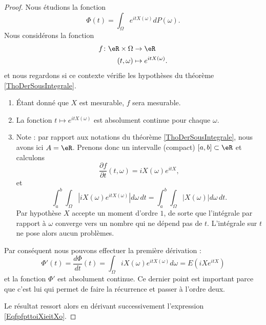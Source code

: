 \begin{proof}
    Nous étudions la fonction
    \begin{equation}
        \Phi(t)=\int_{\Omega} e^{itX(\omega)}dP(\omega).
    \end{equation}
    Nous considérons la fonction
    \begin{equation}
        \begin{aligned}
            f\colon \eR\times\Omega&\to \eR \\
            (t,\omega)&\mapsto  e^{itX(\omega)}. 
        \end{aligned}
    \end{equation}
    et nous regardons si ce contexte vérifie les hypothèses du théorème \ref{ThoDerSousIntegrale}.
    \begin{enumerate}
        \item
            Étant donné que \( X\) est mesurable, \( f\) sera mesurable.
        \item
            La fonction \( t\mapsto e^{itX(\omega)}\) est absolument continue pour chaque \( \omega\).
        \item
            Note : par rapport aux notations du théorème \ref{ThoDerSousIntegrale}, nous avons ici \( A=\eR\). Prenons donc un intervalle (compact) \( \mathopen[ a , b \mathclose]\subset\eR\) et calculons
            \begin{equation}        \label{EqfpfpttoiXieitXo}
                \frac{ \partial f }{ \partial t }(t,\omega)=iX(\omega) e^{itX},
            \end{equation}
            et
            \begin{equation}
                \int_a^b\int_{\Omega}\left| iX(\omega) e^{itX(\omega)} \right| d\omega\,dt=\int_a^b\int_{\Omega}| X(\omega) |d\omega\,dt.
            \end{equation}
            Par hypothèse \( X\) accepte un moment d'ordre \( 1\), de sorte que l'intégrale par rapport à \( \omega\) converge vers un nombre qui ne dépend pas de \( t\). L'intégrale sur \( t\) ne pose alors aucun problèmes.
    \end{enumerate}
    Par conséquent nous pouvons effectuer la première dérivation :
    \begin{equation}
        \Phi'(t)=\frac{ d\Phi }{ dt }(t)=\int_{\Omega}iX(\omega) e^{itX(\omega)}d\omega=E(iX e^{itX})
    \end{equation}
    et la fonction \( \Phi'\) est absolument continue. Ce dernier point est important parce que c'est lui qui permet de faire la récurrence et passer à l'ordre deux.

    Le résultat ressort alors en dérivant successivement l'expression \eqref{EqfpfpttoiXieitXo}.
\end{proof}

